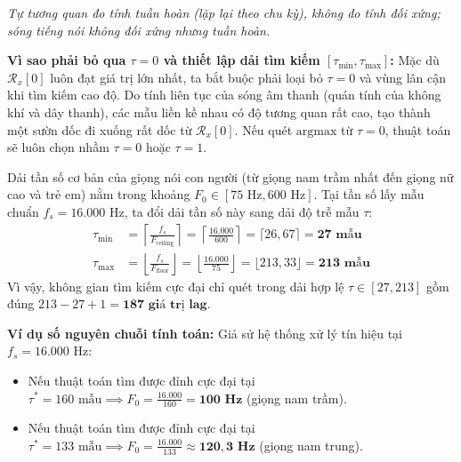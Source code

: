 \documentclass[11pt,a4paper]{article}
\begin{document}
\textit{Tự tương quan đo tính tuần hoàn (lặp lại theo chu kỳ), không đo tính đối xứng; sóng tiếng nói không đối xứng nhưng tuần hoàn.}

\textbf{Vì sao phải bỏ qua $\tau = 0$ và thiết lập dải tìm kiếm $[\tau_{\text{min}}, \tau_{\text{max}}]$:}
Mặc dù $\mathcal{R}_x[0]$ luôn đạt giá trị lớn nhất, ta bắt buộc phải loại bỏ $\tau = 0$ và vùng lân cận khi tìm kiếm cao độ. Do tính liên tục của sóng âm thanh (quán tính của không khí và dây thanh), các mẫu liền kề nhau có độ tương quan rất cao, tạo thành một sườn dốc đi xuống rất dốc từ $\mathcal{R}_x[0]$. Nếu quét $\text{argmax}$ từ $\tau = 0$, thuật toán sẽ luôn chọn nhầm $\tau = 0$ hoặc $\tau = 1$.

Dải tần số cơ bản của giọng nói con người (từ giọng nam trầm nhất đến giọng nữ cao và trẻ em) nằm trong khoảng $F_0 \in [75\text{ Hz}, 600\text{ Hz}]$. Tại tần số lấy mẫu chuẩn $f_s = 16.000\text{ Hz}$, ta đổi dải tần số này sang dải độ trễ mẫu $\tau$:
\begin{align}
\tau_{\text{min}} &= \left\lceil \frac{f_s}{F_{\text{ceiling}}} \right\rceil = \left\lceil \frac{16.000}{600} \right\rceil = \lceil 26{,}67 \rceil = \mathbf{27\text{ mẫu}} \\
\tau_{\text{max}} &= \left\lfloor \frac{f_s}{F_{\text{floor}}} \right\rfloor = \left\lfloor \frac{16.000}{75} \right\rfloor = \lfloor 213{,}33 \rfloor = \mathbf{213\text{ mẫu}}
\end{align}
Vì vậy, không gian tìm kiếm cực đại chỉ quét trong dải hợp lệ $\tau \in [27, 213]$ gồm đúng $213 - 27 + 1 = \mathbf{187\text{ giá trị lag}}$.

\textbf{Ví dụ số nguyên chuỗi tính toán:}
Giả sử hệ thống xử lý tín hiệu tại $f_s = 16.000\text{ Hz}$:
\begin{itemize}
    \setlength{\itemsep}{0.5pt}
    \item Nếu thuật toán tìm được đỉnh cực đại tại $\tau^* = 160\text{ mẫu} \implies F_0 = \frac{16.000}{160} = \mathbf{100\text{ Hz}}$ (giọng nam trầm).
    \item Nếu thuật toán tìm được đỉnh cực đại tại $\tau^* = 133\text{ mẫu} \implies F_0 = \frac{16.000}{133} \approx \mathbf{120{,}3\text{ Hz}}$ (giọng nam trung).
\end{itemize}
\end{document}
